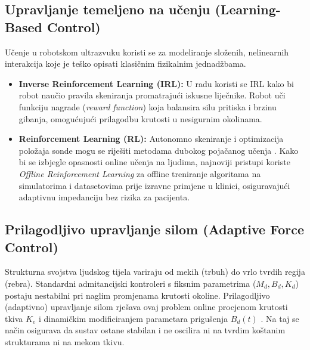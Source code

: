 \subsection{Upravljanje temeljeno na učenju (Learning-Based Control)}
Učenje u robotskom ultrazvuku koristi se za modeliranje složenih, nelinearnih interakcija koje je teško opisati klasičnim fizikalnim jednadžbama.
\begin{itemize}
    \item \textbf{Inverse Reinforcement Learning (IRL):} U radu \cite{ieee2024inverse} koristi se IRL kako bi robot naučio pravila skeniranja promatrajući iskusne liječnike. Robot uči funkciju nagrade (\textit{reward function}) koja balansira silu pritiska i brzinu gibanja, omogućujući prilagodbu krutosti u nesigurnim okolinama.
    \item \textbf{Reinforcement Learning (RL):} Autonomno skeniranje i optimizacija položaja sonde mogu se riješiti metodama dubokog pojačanog učenja \cite{ieee2021autonomic}. Kako bi se izbjegle opasnosti online učenja na ljudima, najnoviji pristupi koriste \textit{Offline Reinforcement Learning} \cite{ieee2025offline} za offline treniranje algoritama na simulatorima i datasetovima prije izravne primjene u klinici, osiguravajući adaptivnu impedanciju bez rizika za pacijenta.
\end{itemize}

\subsection{Prilagodljivo upravljanje silom (Adaptive Force Control)}
Strukturna svojstva ljudskog tijela variraju od mekih (trbuh) do vrlo tvrdih regija (rebra). Standardni admitancijski kontroleri s fiksnim parametrima ($M_d, B_d, K_d$) postaju nestabilni pri naglim promjenama krutosti okoline. Prilagodljivo (adaptivno) upravljanje silom rješava ovaj problem online procjenom krutosti tkiva $K_e$ i dinamičkim modificiranjem parametara prigušenja $B_d(t)$ \cite{jiang2024force, li2026robotic}. Na taj se način osigurava da sustav ostane stabilan i ne oscilira ni na tvrdim koštanim strukturama ni na mekom tkivu.

